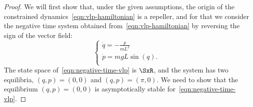 \begin{proof}
We will first show that, under the given assumptions, the origin of the
constrained dynamics~\eqref{eqn:vlp-hamiltonian} is a repeller, and for that
we consider the negative time system obtained
from~\eqref{eqn:vlp-hamiltonian} by reversing the sign of the vector field:
\begin{equation}\label{eqn:negative-time-vlp}
   \begin{cases}
      \dot{q} = -\frac{p}{m L^2} \\
      \dot{p} = mgL\sin(q)
      . \\ 
   \end{cases}
\end{equation}
The state space of~\eqref{eqn:negative-time-vlp} is 
\(\SxR\), and the system has two equilibria,
\((q,p) = (0,0)\) and \((q,p) = (\pi,0)\). 
We need to show that the equilibrium \((q,p) = (0,0)\) is
asymptotically stable for~\eqref{eqn:negative-time-vlp}. 


\end{proof}

